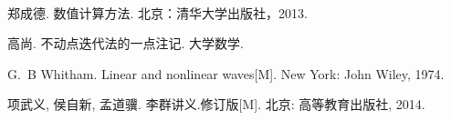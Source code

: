  {
\pagestyle{plain}
 ~\vspace{-2.6cm}
\setlength{\bibsep}{0pt}
\begin{thebibliography}{99}

郑成德.
\newblock 数值计算方法.
\newblock 北京：清华大学出版社，2013.


高尚.
\newblock 不动点迭代法的一点注记.
\newblock 大学数学.

G.~B Whitham.
\newblock Linear and nonlinear waves[M].
\newblock New York: John Wiley, 1974.

项武义, 侯自新, 孟道骥.
\newblock 李群讲义.修订版[M].
\newblock 北京: 高等教育出版社, 2014.


\end{thebibliography}
 }\newpage

